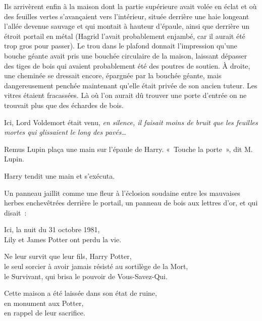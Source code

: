 Ils arrivèrent enfin à la maison dont la partie supérieure avait volée en éclat et où des feuilles vertes s'avançaient vers l'intérieur, située derrière une haie longeant l'allée devenue sauvage et qui montait à hauteur d'épaule, ainsi que derrière un étroit portail en métal (Hagrid l'avait probablement enjambé, car il aurait été trop gros pour passer). Le trou dans le plafond donnait l'impression qu'une bouche géante avait pris une bouchée circulaire de la maison, laissant dépasser des tiges de bois qui avaient probablement été des poutres de soutien. À droite, une cheminée se dressait encore, épargnée par la bouchée géante, mais dangereusement penchée maintenant qu'elle était privée de son ancien tuteur. Les vitres étaient fracassées. Là où l'on aurait dû trouver une porte d'entrée on ne trouvait plus que des échardes de bois.

Ici, Lord Voldemort était venu, \emph{en silence, il faisait moins de bruit que les feuilles mortes qui glissaient le long des pavés…}

Remus Lupin plaça une main sur l'épaule de Harry. «~Touche la porte~», dit M. Lupin.

Harry tendit une main et s'exécuta.

Un panneau jaillit comme une fleur à l'éclosion soudaine entre les mauvaises herbes enchevêtrées derrière le portail, un panneau de bois aux lettres d'or, et qui disait~:
\begin{center}
Ici, la nuit du 31 octobre 1981,\\
Lily et James Potter ont perdu la vie.

Ne leur survit que leur fils, Harry Potter,\\
le seul sorcier à avoir jamais résisté au sortilège de la Mort,\\
le Survivant, qui brisa le pouvoir de Vous-Savez-Qui.

Cette maison a été laissée dans son état de ruine,\\
en monument aux Potter,\\
en rappel de leur sacrifice.
\end{center}

